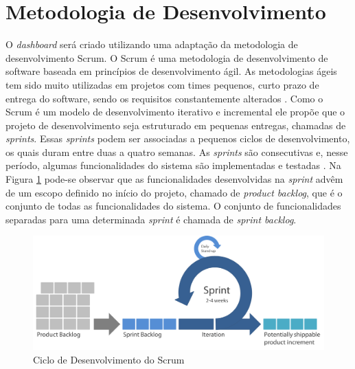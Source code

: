\section{Metodologia de Desenvolvimento}
\label{met_desenvolvimento}
O \textit{dashboard} será criado utilizando uma adaptação da metodologia de desenvolvimento Scrum. O Scrum é uma metodologia de desenvolvimento de software baseada em princípios de desenvolvimento ágil. As metodologias ágeis tem sido muito utilizadas em projetos 	com times pequenos, curto prazo de entrega do software, sendo os requisitos constantemente alterados \cite{lopez-martinez_problems_2016}. Como o Scrum é um modelo de desenvolvimento iterativo e incremental ele propõe que o projeto de desenvolvimento seja estruturado em pequenas entregas, chamadas de \textit{sprints}. Essas \textit{sprints} podem ser associadas a pequenos ciclos de desenvolvimento, os quais duram entre duas a quatro semanas. As \textit{sprints} são consecutivas e, nesse período, algumas funcionalidades do sistema são implementadas e testadas \cite{pagotto_scrum_2016}. Na Figura \ref{img:scrum} pode-se observar que as funcionalidades desenvolvidas na \textit{sprint} advêm de um escopo definido no início do projeto,  chamado de \textit{product backlog}, que é o conjunto de todas as funcionalidades do sistema. O conjunto de funcionalidades separadas para uma determinada \textit{sprint} é chamada de \textit{sprint backlog}\cite{sabbagh_scrum:_2014}.
\graphicspath{{figuras/}}
\begin{figure}[h]
\centering
\includegraphics[scale=0.40]{scrum}
\caption{Ciclo de Desenvolvimento do Scrum}
\label{img:scrum}
\end{figure}

